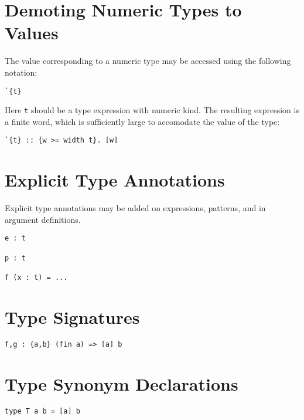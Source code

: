 \section{Demoting Numeric Types to
Values}\label{demoting-numeric-types-to-values}

The value corresponding to a numeric type may be accessed using the
following notation:

\begin{verbatim}
`{t}
\end{verbatim}

Here \texttt{t} should be a type expression with numeric kind. The
resulting expression is a finite word, which is sufficiently large to
accomodate the value of the type:

\begin{verbatim}
`{t} :: {w >= width t}. [w]
\end{verbatim}

\section{Explicit Type Annotations}\label{explicit-type-annotations}

Explicit type annotations may be added on expressions, patterns, and in
argument definitions.

\begin{verbatim}
e : t

p : t

f (x : t) = ...
\end{verbatim}

\section{Type Signatures}\label{type-signatures}

\begin{verbatim}
f,g : {a,b} (fin a) => [a] b
\end{verbatim}

\section{Type Synonym Declarations}\label{type-synonym-declarations}

\begin{verbatim}
type T a b = [a] b
\end{verbatim}
